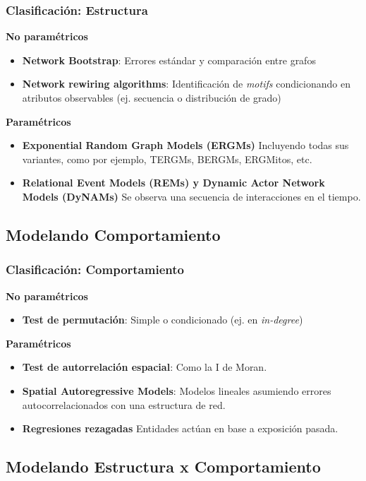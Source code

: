 \documentclass[aspectratio=169]{beamer}
\begin{document}
\begin{frame}
	\frametitle{Clasificación: Estructura}
\pause
	\textbf{No paramétricos}
	\begin{itemize}
		\item \textbf{Network Bootstrap}: Errores estándar y comparación entre grafos
		\item \textbf{Network rewiring algorithms}: Identificación de \textit{motifs} condicionando en atributos observables (ej. secuencia o distribución de grado)
	\end{itemize}\pause	
	
	\textbf{Paramétricos}

	\begin{itemize}
		\item \textbf{Exponential Random Graph Models (ERGMs)} Incluyendo todas sus variantes, como por ejemplo, TERGMs, BERGMs, ERGMitos, etc.
		\item \textbf{Relational Event Models (REMs) y Dynamic Actor Network Models (DyNAMs)} Se observa una secuencia de interacciones en el tiempo.
	\end{itemize}
	
\end{frame}

\subsection{Modelando Comportamiento}

\begin{frame}
	\frametitle{Clasificación: Comportamiento}
\pause	
	\textbf{No paramétricos}
	\begin{itemize}
		\item \textbf{Test de permutación}: Simple o condicionado (ej. en \textit{in-degree})
	\end{itemize}
\pause
	\textbf{Paramétricos}
	\begin{itemize}
		\item \textbf{Test de autorrelación espacial}: Como la I de Moran.
		\item \textbf{Spatial Autoregressive Models}: Modelos lineales asumiendo errores autocorrelacionados con una estructura de red.
		\item \textbf{Regresiones rezagadas} Entidades actúan en base a exposición pasada.
	\end{itemize}
	
\end{frame}

\subsection{Modelando Estructura x Comportamiento}
\end{document}
